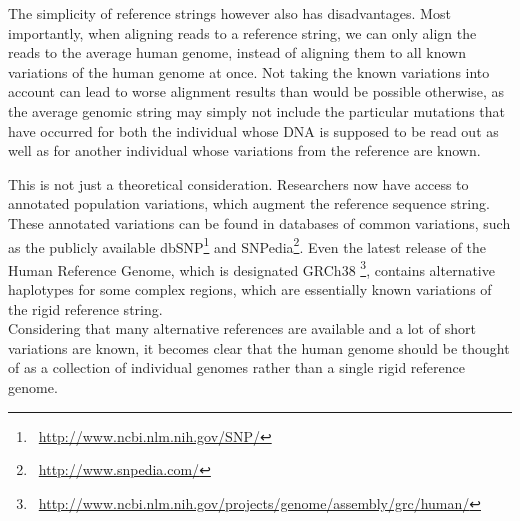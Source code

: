 \documentclass[a4paper,12pt,twoside,BCOR=10mm]{scrbook}
\begin{document}
The simplicity of reference strings however also has disadvantages.
Most importantly, when aligning reads to a reference string, we can only align
the reads to the average human genome, instead of aligning them to all known
variations of the human genome at once.
Not taking the known variations into account can lead to worse alignment results
than would be possible otherwise, as the average genomic string may simply not
include the particular mutations that have occurred for both the individual
whose DNA is supposed to be read out as well as for another individual whose
variations from the reference are known.

This is not just a theoretical consideration.
Researchers now have access to annotated population variations, which augment the reference sequence string.
These annotated variations can be found in databases of common variations, such as the publicly available
dbSNP\footnote{\,\,\,\url{http://www.ncbi.nlm.nih.gov/SNP/}}
and SNPedia\footnote{\,\,\,\url{http://www.snpedia.com/}}.
Even the latest release of the Human Reference Genome,
which is designated GRCh38
\footnote{\,\,\,\url{http://www.ncbi.nlm.nih.gov/projects/genome/assembly/grc/human/}},
contains alternative haplotypes for some complex regions,
which are essentially known variations of the rigid reference string. \\
Considering that many alternative references are available and a lot of short variations are known,
it becomes clear that the human genome should be thought of as a collection of individual genomes
rather than a single rigid reference genome.
\end{document}

